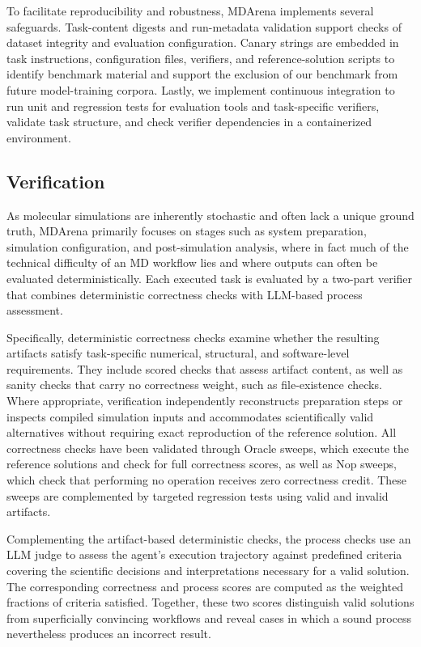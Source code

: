 \documentclass[twoside,twocolumn,9pt]{article}
\begin{document}
To facilitate reproducibility and robustness, MDArena implements several safeguards. Task-content digests and run-metadata validation support checks of dataset integrity and evaluation configuration. Canary strings are embedded in task instructions, configuration files, verifiers, and reference-solution scripts to identify benchmark material and support the exclusion of our benchmark from future model-training corpora. Lastly, we implement continuous integration to run unit and regression tests for evaluation tools and task-specific verifiers, validate task structure, and check verifier dependencies in a containerized environment. 

\subsection{Verification}

As molecular simulations are inherently stochastic and often lack a unique ground truth,\cite{wan2021uncertainty,communicationsbiology2023checklist}  MDArena primarily focuses on stages such as system preparation, simulation configuration, and post-simulation analysis, where in fact much of the technical difficulty of an MD workflow lies and where outputs can often be evaluated deterministically. Each executed task is evaluated by a two-part verifier that combines deterministic correctness checks with LLM-based process assessment. 

Specifically, deterministic correctness checks examine whether the resulting artifacts satisfy task-specific numerical, structural, and software-level requirements. They include scored checks that assess artifact content, as well as sanity checks that carry no correctness weight, such as file-existence checks. Where appropriate, verification independently reconstructs preparation steps or inspects compiled simulation inputs and accommodates scientifically valid alternatives without requiring exact reproduction of the reference solution. All correctness checks have been validated through Oracle sweeps, which execute the reference solutions and check for full correctness scores, as well as Nop sweeps, which check that performing no operation receives zero correctness credit. These sweeps are complemented by targeted regression tests using valid and invalid artifacts. 

Complementing the artifact-based deterministic checks, the process checks use an LLM judge to assess the agent’s execution trajectory against predefined criteria covering the scientific decisions and interpretations necessary for a valid solution. The corresponding correctness and process scores are computed as the weighted fractions of criteria satisfied. Together, these two scores distinguish valid solutions from superficially convincing workflows and reveal cases in which a sound process nevertheless produces an incorrect result. 
\end{document}
